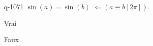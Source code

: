 \begin{truefalse}{q-1071}
$\sin(a)=\sin(b)$  $\Leftarrow \left(a\equiv b [2\pi]\right)$.
\item* Vrai
\item Faux
\end{truefalse}

